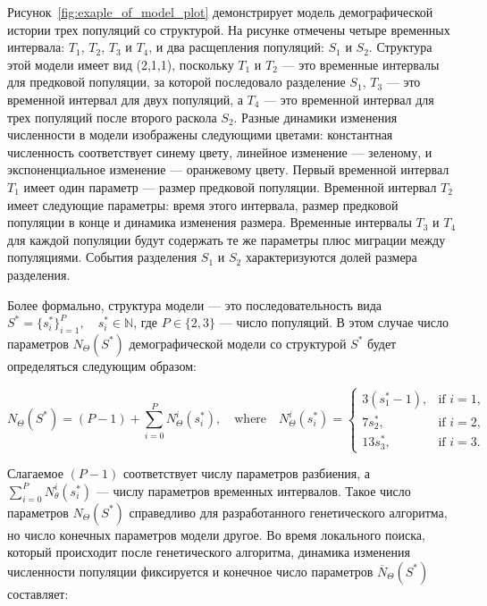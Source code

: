 Рисунок~\ref{fig:exaple_of_model_plot} демонстрирует модель демографической истории трех популяций со структурой.
На рисунке отмечены четыре временных интервала: $T_1$, $T_2$, $T_3$ и $T_4$, и два расщепления популяций: $S_1$ и $S_2$.
Структура этой модели имеет вид (2,1,1), поскольку $T_1$ и $T_2$ --- это временные интервалы для предковой популяции, за которой последовало разделение $S_1$, $T_3$ --- это временной интервал для двух популяций, а $T_4$ --- это временной интервал для трех популяций после второго раскола $S_2$.
Разные динамики изменения численности в модели изображены следующими цветами: константная численность соответствует синему цвету, линейное изменение --- зеленому, и экспоненциальное изменение --- оранжевому цвету.
Первый временной интервал $T_1$ имеет один параметр --- размер предковой популяции.
Временной интервал $T_2$ имеет следующие параметры: время этого интервала, размер предковой популяции в конце и динамика изменения размера.
Временные интервалы $T_3$ и $T_4$ для каждой популяции будут содержать те же параметры плюс миграции между популяциями. 
События разделения $S_1$ и $S_2$ характеризуются долей размера разделения.

Более формально, структура модели --- это последовательность вида $S^* = \{s^*_i\}_{i=1}^P, \quad s^*_i \in \mathbb{N}$, где $P \in \{2, 3\}$ --- число популяций.
В этом случае число параметров $N_\Theta(S^*)$ демографической модели со структурой $S^*$ будет определяться следующим образом:

\begin{equation}N_\Theta (S^*) = (P-1)  + \sum_{i = 0}^P{N_\Theta^i(s^*_i)},\quad
\text{where} \quad N_\Theta^i(s^*_i) = \begin{cases}
        3(s^*_1 - 1), & \text{if } i = 1,\\
        7s^*_2, & \text{if } i = 2,\\
        13s^*_3, & \text{if } i = 3.
        \end{cases} 
\end{equation}

Слагаемое $(P - 1)$ соответствует числу параметров разбиения, а $\sum_{i = 0}^P{N_\theta^i(s^*_i)}$ --- числу параметров временных интервалов.
Такое число параметров $N_\Theta (S^*)$ справедливо для разработанного генетического алгоритма, но число конечных параметров модели другое.
Во время локального поиска, который происходит после генетического алгоритма, динамика изменения численности популяции фиксируется и конечное число параметров $\overline{N}_\Theta (S^*)$ составляет:

